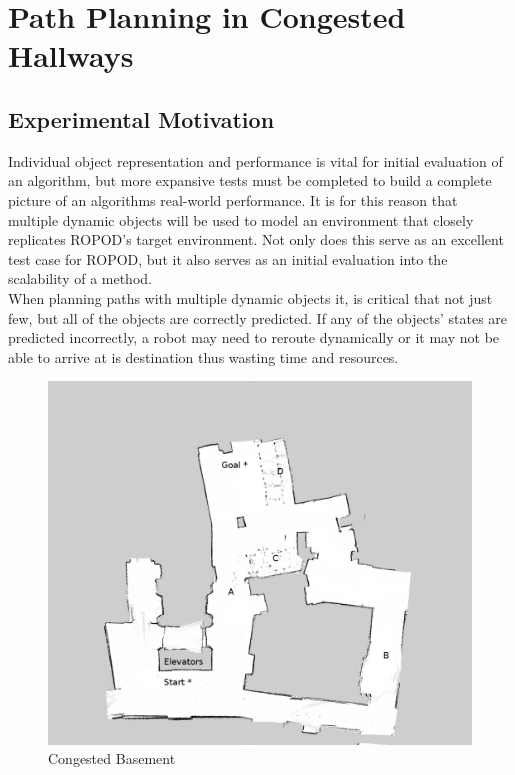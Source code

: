   \newpage
  \section{ Path Planning in Congested Hallways}

  \subsection{ Experimental Motivation }

  Individual object representation and performance is vital for initial
  evaluation of an algorithm, but more expansive tests must be completed to
  build a complete picture of an algorithms real-world performance. It is for
  this reason that multiple dynamic objects will be used to model an environment
  that closely replicates ROPOD's target environment. Not only does this
  serve as an excellent test case for ROPOD, but it also serves as an initial
  evaluation into the scalability of a method. \\

  When planning paths with multiple dynamic objects it, is critical that not just
  few, but all of the objects are correctly predicted. If any of the objects' states are
  predicted incorrectly, a robot may need to reroute dynamically or it may not
  be able to arrive at is destination thus wasting time and resources. \\


  \begin{figure}[!htb]
    \centering
    \includegraphics[width=\linewidth]{images/basement_congestion.png}
    \caption{Congested Basement}
    \label{figure:basement_congestion}
  \end{figure}

